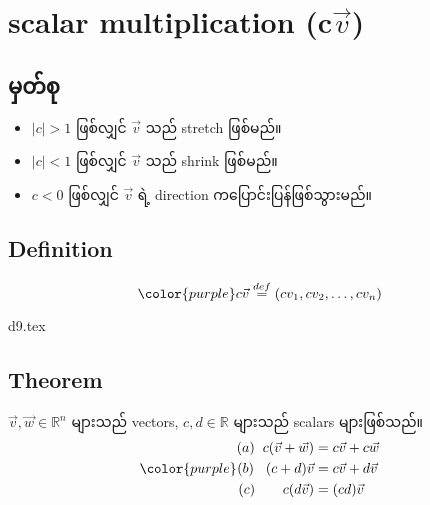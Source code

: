 \section{scalar multiplication (c$\vec{v}$)}
\subsection{မှတ်စု}
\begin{itemize}
    \item $|c|>1$ ဖြစ်လျှင် $\vec{v}$ သည် stretch ဖြစ်မည်။
    \item $|c|<1$ ဖြစ်လျှင် $\vec{v}$ သည် shrink ဖြစ်မည်။
    \item $c<0$ ဖြစ်လျှင် $\vec{v}$ ရဲ့ direction ကပြောင်းပြန်ဖြစ်သွားမည်။
\end{itemize}
\subsection{Definition}
\begin{equation}
    {\color{purple} c\vec{v}\stackrel{def}{=}(cv_1,cv_2,\dots,cv_n)}
\end{equation}
\begin{center}
    {d9.tex}
\end{center}
\subsection{Theorem}
$\vec{v}, \vec{w} \in \mathbb{R}^n$ များသည် vectors, $c, d \in \mathbb{R}$ များသည် scalars များဖြစ်သည်။
\begin{equation}
    {\color{purple}
        \begin{split}
            (a) \hspace{2mm} c(\vec{v}+\vec{w})& =c\vec{v}+c\vec{w} \\
            (b) \hspace{3mm} (c+d)\vec{v}& =c\vec{v}+d\vec{v} \\
            (c) \hspace{7mm} c(d\vec{v})& =(cd)\vec{v}
        \end{split}}
        \label{eq:scalar-multiplication-theorem}
\end{equation}